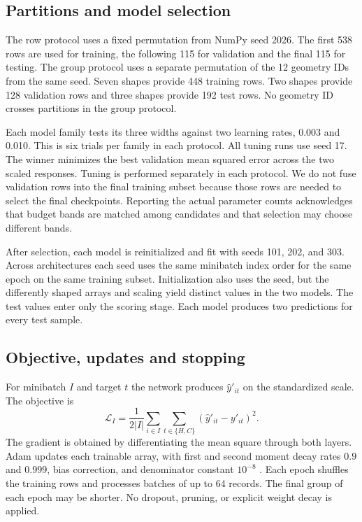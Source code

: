\documentclass[11pt,twocolumn,letterpaper]{article}
\begin{document}
\subsection{Partitions and model selection}
The row protocol uses a fixed permutation from NumPy seed 2026. The first 538 rows are used for training, the following 115 for validation and the final 115 for testing. The group protocol uses a separate permutation of the 12 geometry IDs from the same seed. Seven shapes provide 448 training rows. Two shapes provide 128 validation rows and three shapes provide 192 test rows. No geometry ID crosses partitions in the group protocol.

Each model family tests its three widths against two learning rates, 0.003 and 0.010. This is six trials per family in each protocol. All tuning runs use seed 17. The winner minimizes the best validation mean squared error across the two scaled responses. Tuning is performed separately in each protocol. We do not fuse validation rows into the final training subset because those rows are needed to select the final checkpoints. Reporting the actual parameter counts acknowledges that budget bands are matched among candidates and that selection may choose different bands.

After selection, each model is reinitialized and fit with seeds 101, 202, and 303. Across architectures each seed uses the same minibatch index order for the same epoch on the same training subset. Initialization also uses the seed, but the differently shaped arrays and scaling yield distinct values in the two models. The test values enter only the scoring stage. Each model produces two predictions for every test sample.

\subsection{Objective, updates and stopping}
For minibatch \(I\) and target \(t\) the network produces \(\widehat y'_{it}\) on the standardized scale. The objective is
\begin{equation}
 \mathcal L_I=\frac{1}{2|I|}
 \sum_{i\in I}\sum_{t\in\{H,C\}}
    (\widehat y'_{it}-y'_{it})^2 .
\end{equation}
The gradient is obtained by differentiating the mean square through both layers. Adam updates each trainable array, with first and second moment decay rates \(0.9\) and \(0.999\), bias correction, and denominator constant \(10^{-8}\) \cite{adam}. Each epoch shuffles the training rows and processes batches of up to 64 records. The final group of each epoch may be shorter. No dropout, pruning, or explicit weight decay is applied.
\end{document}
